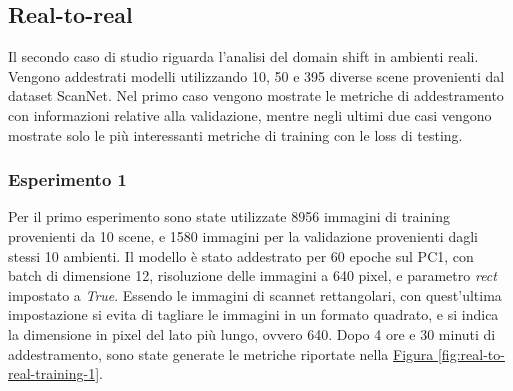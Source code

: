 \documentclass[12pt]{report}
\begin{document}
\subsection{Real-to-real}
\label{sec:real_to_real}

Il secondo caso di studio riguarda l'analisi del domain shift in ambienti reali. Vengono addestrati modelli utilizzando 10, 50 e 395 diverse scene provenienti dal dataset ScanNet. Nel primo caso vengono mostrate le metriche di addestramento con informazioni relative alla validazione, mentre negli ultimi due casi vengono mostrate solo le più interessanti metriche di training con le loss di testing.

\subsubsection{Esperimento 1}
\label{sec:esperimento_ds_2_1}

Per il primo esperimento sono state utilizzate 8956 immagini di training provenienti da 10 scene, e 1580 immagini per la validazione provenienti dagli stessi 10 ambienti. Il modello è stato addestrato per 60 epoche sul PC1, con batch di dimensione 12, risoluzione delle immagini a 640 pixel, e parametro \textit{rect} impostato a \textit{True}. Essendo le immagini di scannet rettangolari, con quest'ultima impostazione si evita di tagliare le immagini in un formato quadrato, e si indica la dimensione in pixel del lato più lungo, ovvero 640. Dopo 4 ore e 30 minuti di addestramento, sono state generate le metriche riportate nella \hyperref[fig:real-to-real-training-1]{Figura \ref{fig:real-to-real-training-1}}.
\end{document}
